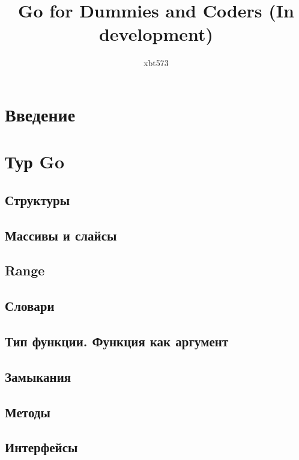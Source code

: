 \documentclass{article}
\title{Go for Dummies and Coders (In development)}
\author{xbt573}
\begin{document}
    \maketitle
    \newpage

    \tableofcontents
    \newpage

    \section{Введение}

    \section{Тур Go}
        
        
        
        
        
        
        
        
        
        
        
        \subsection{Структуры}
        \subsection{Массивы и слайсы}
        \subsection{Range}
        \subsection{Словари}
        \subsection{Тип функции. Функция как аргумент}
        \subsection{Замыкания}
        \subsection{Методы}
        \subsection{Интерфейсы}
\end{document}
